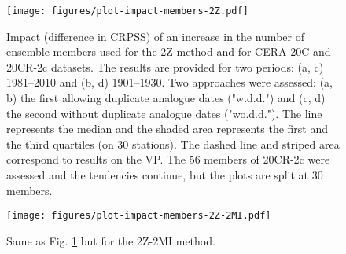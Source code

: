 \documentclass{ametsoc}
\begin{document}
\begin{figure}[t]
	\noindent\texttt{[image: figures/plot-impact-members-2Z.pdf]}\\
	\caption{Impact (difference in CRPSS) of an increase in the number of ensemble members used for the 2Z method and for CERA-20C and 20CR-2c datasets. The results are provided for two periods: (a, c) 1981--2010 and (b, d) 1901--1930. Two approaches were assessed: (a, b) the first allowing duplicate analogue dates ("w.d.d.") and (c, d) the second without duplicate analogue dates ("wo.d.d."). The line represents the median and the shaded area represents the first and the third quartiles (on 30 stations). The dashed line and striped area correspond to results on the VP. The 56 members of 20CR-2c were assessed and the tendencies continue, but the plots are split at 30 members.}
	\label{fig:plot_impact_members_2Z}
\end{figure}

\begin{figure}[t]
	\noindent\texttt{[image: figures/plot-impact-members-2Z-2MI.pdf]}\\
	\caption{Same as Fig. \ref{fig:plot_impact_members_2Z} but for the 2Z-2MI method.}
	\label{fig:plot_impact_members_2Z-2MI}
\end{figure}
\end{document}
